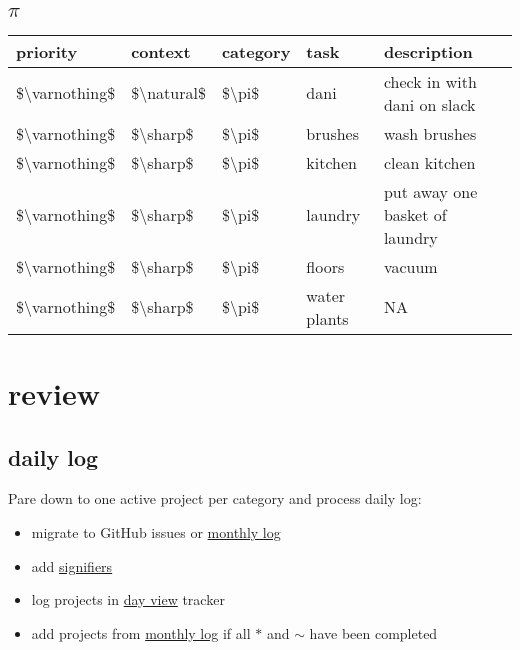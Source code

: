 \documentclass[]{book}
\providecommand{\tightlist}{%
  \setlength{\itemsep}{0pt}\setlength{\parskip}{0pt}}
\begin{document}
\hypertarget{pi}{%
\subsection{\texorpdfstring{\(\pi\)}{\textbackslash{}pi}}\label{pi}}

\begin{tabular}{l|l|l|l|l}
\hline
priority & context & category & task & description\\
\hline
\$\textbackslash{}varnothing\$ & \$\textbackslash{}natural\$ & \$\textbackslash{}pi\$ & dani & check in with dani on slack\\
\hline
\$\textbackslash{}varnothing\$ & \$\textbackslash{}sharp\$ & \$\textbackslash{}pi\$ & brushes & wash brushes\\
\hline
\$\textbackslash{}varnothing\$ & \$\textbackslash{}sharp\$ & \$\textbackslash{}pi\$ & kitchen & clean kitchen\\
\hline
\$\textbackslash{}varnothing\$ & \$\textbackslash{}sharp\$ & \$\textbackslash{}pi\$ & laundry & put away one basket of laundry\\
\hline
\$\textbackslash{}varnothing\$ & \$\textbackslash{}sharp\$ & \$\textbackslash{}pi\$ & floors & vacuum\\
\hline
\$\textbackslash{}varnothing\$ & \$\textbackslash{}sharp\$ & \$\textbackslash{}pi\$ & water plants & NA\\
\hline
\end{tabular}

\hypertarget{review}{%
\section{review}\label{review}}

\hypertarget{daily-log}{%
\subsection{daily log}\label{daily-log}}

Pare down to one active project per category and process daily log:

\begin{itemize}
\tightlist
\item
  migrate to GitHub issues or \protect\hyperlink{monthly-log}{monthly log}
\item
  add \protect\hyperlink{signifiers}{signifiers}
\item
  log projects in \protect\hyperlink{day-view}{day view} tracker
\item
  add projects from \protect\hyperlink{monthly-log}{monthly log} if all \(*\) and \(\sim\) have been completed
\end{itemize}
\end{document}
